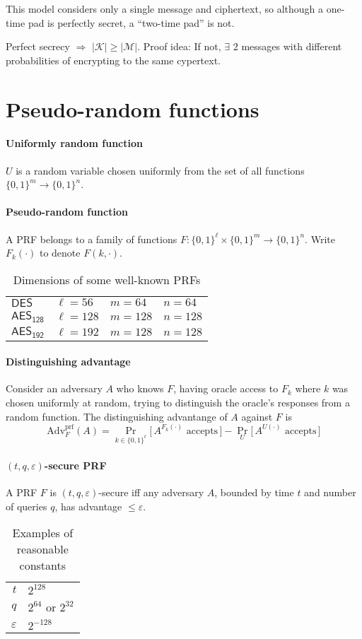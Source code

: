 \documentclass[11pt]{article}
\begin{document}
This model considers only a single message and ciphertext,
so although a one-time pad is perfectly secret, a ``two-time pad'' is not.

Perfect secrecy $\Rightarrow$ $|\mathcal{K}| \ge |\mathcal{M}|$.
Proof idea: If not, $\exists$ $2$ messages with different probabilities
of encrypting to the same cypertext.

\section{Pseudo-random functions}

\paragraph{Uniformly random function}
$U$ is a random variable chosen uniformly from the set of all functions
$\{0,1\}^m \rightarrow \{0,1\}^n$.

\paragraph{Pseudo-random function}
A PRF belongs to a family of functions
$F : \{0,1\}^\ell \times \{0,1\}^m \rightarrow \{0,1\}^n$.
Write $F_k(\cdot)$ to denote $F(k, \cdot)$.

\begin{SCtable}[2.5][h]
\caption*{Dimensions of some well-known PRFs}
\begin{tabular}{l|lll}
$\mathsf{DES}$ & $\ell = 56$ & $m = 64$ & $n = 64$ \\
$\mathsf{AES_{128}}$ & $\ell = 128$ & $m = 128$ & $n = 128$ \\
$\mathsf{AES_{192}}$ & $\ell = 192$ & $m = 128$ & $n = 128$
\end{tabular}
\end{SCtable}

\paragraph{Distinguishing advantage}
Consider an adversary $A$ who knows $F$, having oracle access
to $F_k$ where $k$ was chosen uniformly at random, trying to
distinguish the oracle's responses from a random function.
The distinguishing advantange of $A$ against $F$ is
\[ \textrm{Adv}_F^\textrm{prf} (A) = 
\Pr_{k\in\{0,1\}^\ell} \big[ \, A^{F_k(\cdot)} \textrm{ accepts} \, \big]
- \Pr_U \big[ \, A^{U(\cdot)} \textrm{ accepts} \, \big] \]

\paragraph{$(t,q,\varepsilon)$-secure PRF}
A PRF $F$ is $(t,q,\varepsilon)$-secure iff any adversary $A$,
bounded by time $t$ and number of queries $q$,
has advantage $\le \varepsilon$.

\begin{SCtable}[2.5][h]
\caption*{Examples of reasonable constants}
\begin{tabular}{r|l}
$t$ & $2^{128}$ \\
$q$ & $2^{64}$ or $2^{32}$ \\
$\varepsilon$ & $2^{-128}$
\end{tabular}
\end{SCtable}
\end{document}
